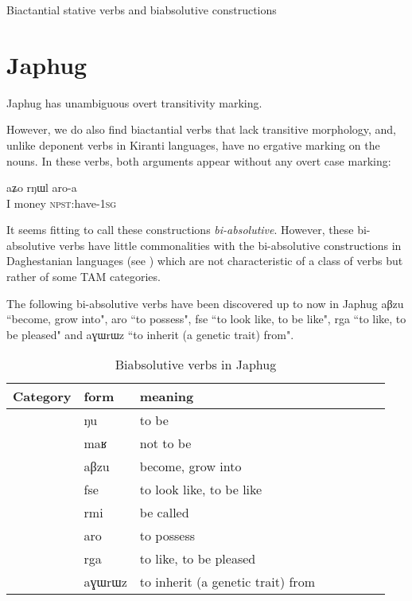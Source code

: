 \documentclass[oldfontcommands,oneside,a4paper,11pt]{article}
\newcommand{\ipa}[1]{{\phon #1}} %
\newcommand{\sg}{\textsc{sg}}
\begin{document}
 
Biactantial stative verbs and biabsolutive constructions


\section{Japhug}
Japhug has unambiguous overt transitivity marking.

However, we do also find biactantial verbs that lack transitive morphology, and, unlike deponent verbs in Kiranti languages, have no ergative marking on the nouns. In these verbs, both arguments   appear without any overt case marking:

\begin{exe}
\ex 
\gll   aʑo rŋɯl aro-a  \\
I money \textsc{npst}:have-1\sg{} \\
\glt  
\end{exe}



It seems fitting to call these constructions \textit{bi-absolutive}. However, these bi-absolutive verbs have little commonalities with the bi-absolutive constructions in Daghestanian languages (see \citealt{forker12biabsolutive}) which are not characteristic of a class of verbs but rather of some TAM categories.

The following bi-absolutive verbs have been discovered up to now in Japhug \ipa{aβzu} ``become, grow into", \ipa{aro} ``to possess", \ipa{fse} ``to look like, to be like", \ipa{rga} ``to like, to be pleased" and \ipa{aɣɯrɯz} ``to inherit (a genetic trait) from".

\begin{table}[H]
\caption{ Biabsolutive verbs in Japhug}  
 
\begin{tabular}{llllllll}
\toprule
 Category & form & meaning \\
 \midrule
 &\ipa{ŋu} & to be\\
 &\ipa{maʁ} & not to be\\
& \ipa{aβzu} & become, grow into\\
  & \ipa{fse} & to look like, to be like\\
 & \ipa{rmi} & be called\\
  &\ipa{aro} &to possess\\
  & \ipa{rga} &to like, to be pleased\\
  &\ipa{aɣɯrɯz} &to inherit (a genetic trait) from\\
\bottomrule
\end{tabular}
\end{table}
\end{document}
